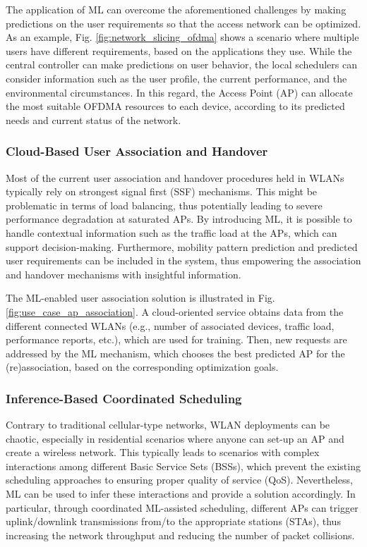 \documentclass[twocolumn]{article}
\begin{document}
The application of ML can overcome the aforementioned challenges by making predictions on the user requirements so that the access network can be optimized. As an example, Fig. \ref{fig:network_slicing_ofdma} shows a scenario where multiple users have different requirements, based on the applications they use. While the central controller can make predictions on user behavior, the local schedulers can consider information such as the user profile, the current performance, and the environmental circumstances. In this regard, the Access Point (AP) can allocate the most suitable OFDMA resources to each device, according to its predicted needs and current status of the network.

\subsubsection{Cloud-Based User Association and Handover}
Most of the current user association and handover procedures held in WLANs typically rely on strongest signal first (SSF) mechanisms. This might be problematic in terms of load balancing, thus potentially leading to severe performance degradation at saturated APs. By introducing ML, it is possible to handle contextual information such as the traffic load at the APs, which can support decision-making. Furthermore, mobility pattern prediction and predicted user requirements can be included in the system, thus empowering the association and handover mechanisms with insightful information. %

The ML-enabled user association solution is illustrated in Fig. \ref{fig:use_case_ap_association}. A cloud-oriented service obtains data from the different connected WLANs (e.g., number of associated devices, traffic load, performance reports, etc.), which are used for training. Then, new requests are addressed by the ML mechanism, which chooses the best predicted AP for the (re)association, based on the corresponding optimization goals.

\subsubsection{Inference-Based Coordinated Scheduling}

Contrary to traditional cellular-type networks, WLAN deployments can be chaotic, especially in residential scenarios where anyone can set-up an AP and create a wireless network. This typically leads to scenarios with complex interactions among different Basic Service Sets (BSSs), which prevent the existing scheduling approaches to ensuring proper quality of service (QoS). Nevertheless, ML can be used to infer these interactions and provide a solution accordingly. In particular, through coordinated ML-assisted scheduling, different APs can trigger uplink/downlink transmissions from/to the appropriate stations (STAs), thus increasing the network throughput and reducing the number of packet collisions.
\end{document}
